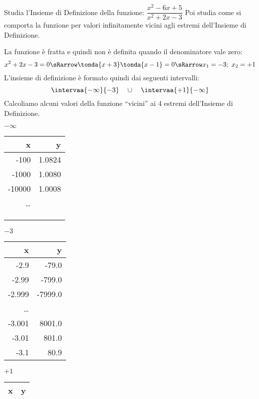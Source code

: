 \begin{esempio}
 Studia l'Insieme di Definizione della funzione: 
 \(\dfrac{x^2-6x+5}{x^2+2x-3}\)
 Poi studia come si comporta la funzione per valori infinitamente vicini 
agli estremi dell'Insieme di Definizione.

La funzione è fratta e quindi non è definita quando il denominatore vale 
zero:
\[x^2+2x-3=0 \sRarrow \tonda{x+3}\tonda{x-1}=0 \sRarrow x_1=-3;~x_2=+1\]
L'insieme di definizione è formato quindi dai seguenti intervalli:
\[\intervaa{-\infty}{-3} \quad \cup \quad \intervaa{+1}{-\infty}\]
Calcoliamo alcuni valori della funzione ``vicini'' ai 4 estremi 
dell'Insieme di Definizione.

\begin{minipage}{.24\textwidth}
\begin{center}
\(-\infty\)\\
\begin{tabular}{r|r}
x & y\\\hline
-100 & 1.0824 \\
-1000 & 1.0080 \\
-10000 & 1.0008 \\
\dots \\
&\\
&\\
&
\end{tabular}
\end{center}
\end{minipage}
\begin{minipage}{.24\textwidth}
\begin{center}
\(-3\)\\
\begin{tabular}{r|r}
x & y\\\hline
-2.9 & -79.0 \\
-2.99 & -799.0 \\
-2.999 & -7999.0 \\
\dots \\
-3.001 & 8001.0 \\
-3.01 & 801.0 \\
-3.1 & 80.9 \\
\end{tabular}
\end{center}
\end{minipage}
\begin{minipage}{.24\textwidth}
\begin{center}
\(+1\)\\
\begin{tabular}{r|r}
x & y\\\hline

\end{tabular}
\end{center}
\end{minipage}
\end{esempio}

